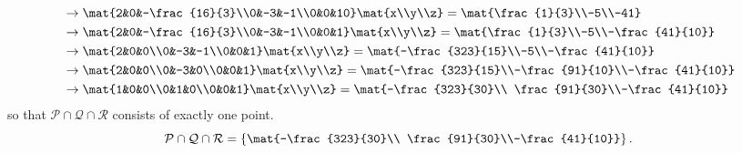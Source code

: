 \begin{exercises}
\begin{problist}
\begin{solution}
\begin{align*}
				&\rightarrow \mat{2&0&-\frac{16}{3}\\0&-3&-1\\0&0&10}\mat{x\\y\\z}=\mat{\frac{1}{3}\\-5\\-41}\\
				&\rightarrow \mat{2&0&-\frac{16}{3}\\0&-3&-1\\0&0&1}\mat{x\\y\\z}=\mat{\frac{1}{3}\\-5\\-\frac{41}{10}}\\
				&\rightarrow \mat{2&0&0\\0&-3&-1\\0&0&1}\mat{x\\y\\z}=\mat{-\frac{323}{15}\\-5\\-\frac{41}{10}}\\
				&\rightarrow \mat{2&0&0\\0&-3&0\\0&0&1}\mat{x\\y\\z}=\mat{-\frac{323}{15}\\-\frac{91}{10}\\-\frac{41}{10}}\\
				&\rightarrow \mat{1&0&0\\0&1&0\\0&0&1}\mat{x\\y\\z}=\mat{-\frac{323}{30}\\ \frac{91}{30}\\-\frac{41}{10}}
			\end{align*}
			so that $\mathcal{P}\cap\mathcal{Q}\cap\mathcal{R}$ consists of exactly one point. 
			\[ \mathcal{P}\cap\mathcal{Q}\cap\mathcal{R}=\left\lbrace\mat{-\frac{323}{30}\\ \frac{91}{30}\\-\frac{41}{10}}\right\rbrace.\]
		\end{solution}	
	\end{problist}
\end{exercises}
